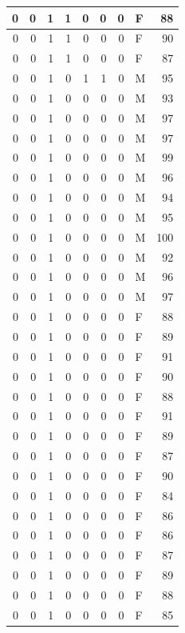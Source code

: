 \documentclass[
  12pt,
]{krantz}
\begin{document}
\begin{tabular}{r|r|r|r|r|r|r|l|r}
\hline
0 & 0 & 1 & 1 & 0 & 0 & 0 & F & 88\\
\hline
0 & 0 & 1 & 1 & 0 & 0 & 0 & F & 90\\
\hline
0 & 0 & 1 & 1 & 0 & 0 & 0 & F & 87\\
\hline
0 & 0 & 1 & 0 & 1 & 1 & 0 & M & 95\\
\hline
0 & 0 & 1 & 0 & 0 & 0 & 0 & M & 93\\
\hline
0 & 0 & 1 & 0 & 0 & 0 & 0 & M & 97\\
\hline
0 & 0 & 1 & 0 & 0 & 0 & 0 & M & 97\\
\hline
0 & 0 & 1 & 0 & 0 & 0 & 0 & M & 99\\
\hline
0 & 0 & 1 & 0 & 0 & 0 & 0 & M & 96\\
\hline
0 & 0 & 1 & 0 & 0 & 0 & 0 & M & 94\\
\hline
0 & 0 & 1 & 0 & 0 & 0 & 0 & M & 95\\
\hline
0 & 0 & 1 & 0 & 0 & 0 & 0 & M & 100\\
\hline
0 & 0 & 1 & 0 & 0 & 0 & 0 & M & 92\\
\hline
0 & 0 & 1 & 0 & 0 & 0 & 0 & M & 96\\
\hline
0 & 0 & 1 & 0 & 0 & 0 & 0 & M & 97\\
\hline
0 & 0 & 1 & 0 & 0 & 0 & 0 & F & 88\\
\hline
0 & 0 & 1 & 0 & 0 & 0 & 0 & F & 89\\
\hline
0 & 0 & 1 & 0 & 0 & 0 & 0 & F & 91\\
\hline
0 & 0 & 1 & 0 & 0 & 0 & 0 & F & 90\\
\hline
0 & 0 & 1 & 0 & 0 & 0 & 0 & F & 88\\
\hline
0 & 0 & 1 & 0 & 0 & 0 & 0 & F & 91\\
\hline
0 & 0 & 1 & 0 & 0 & 0 & 0 & F & 89\\
\hline
0 & 0 & 1 & 0 & 0 & 0 & 0 & F & 87\\
\hline
0 & 0 & 1 & 0 & 0 & 0 & 0 & F & 90\\
\hline
0 & 0 & 1 & 0 & 0 & 0 & 0 & F & 84\\
\hline
0 & 0 & 1 & 0 & 0 & 0 & 0 & F & 86\\
\hline
0 & 0 & 1 & 0 & 0 & 0 & 0 & F & 86\\
\hline
0 & 0 & 1 & 0 & 0 & 0 & 0 & F & 87\\
\hline
0 & 0 & 1 & 0 & 0 & 0 & 0 & F & 89\\
\hline
0 & 0 & 1 & 0 & 0 & 0 & 0 & F & 88\\
\hline
0 & 0 & 1 & 0 & 0 & 0 & 0 & F & 85\\

\end{tabular}
\end{document}
